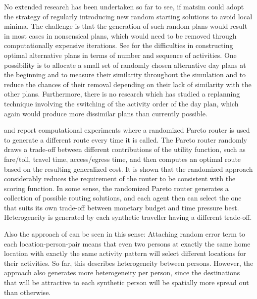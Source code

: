 
No extended research has been undertaken so far to see, if \gls{matsim} could adopt the strategy of 
regularly introducing new random 
starting solutions to avoid local minima. 
The challenge is that the generation of such random plans would result in most cases in nonsensical plans, which would need to be removed through computationally expensive iterations. 
See \citet[][]{Feil_PhDThesis_2010} for the difficulties in constructing optimal alternative plans in terms of number and sequence of activities. 
One possibility is to allocate a small set of randomly chosen alternative day plans at the beginning and to measure their similarity throughout the simulation and to reduce the chances of their removal depending on their lack of similarity with the other plans. 
Furthermore, there is no research which has studied a replanning technique involving the switching of the activity order of the day plan, which again would produce more dissimilar plans than currently possible. 

\cite{MoyoNagelptNetCalibration} and \cite{NagelKickhoeferJoubertHeterogeneousVoTs} report computational experiments where a randomized Pareto router is used to generate a different route every time it is called.  The Pareto router randomly draws a trade-off between different contributions of the utility function, such as fare/toll, travel time, access/egress time, and then computes an optimal route based on the resulting generalized cost.  It is shown that the randomized approach considerably reduces the requirement of the router to be consistent with the scoring function.  In some sense, the randomized Pareto router generates a collection of possible routing solutions, and each agent then can select the one that suits its own trade-off between monetary budget and time pressure best.  Heterogeneity is generated by each synthetic traveller having a different trade-off.

Also the approach of \cite[][, also see Chapter~\ref{ch:destinationchoice} of this book]{Horni_PhDThesis_forth} can be seen in this sense: Attaching random error term to each location-person-pair means that even two persons at exactly the same home location with exactly the same activity pattern will select different locations for their activities.  So far, this describes heterogeneity between persons.  However, the approach also generates more heterogeneity per person, since the destinations that will be attractive to each synthetic person will be spatially more spread out than otherwise.




